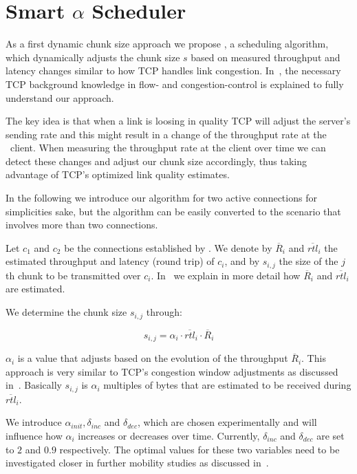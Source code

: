 \section{Smart $\alpha$ Scheduler}
\label{sec:alpha-approach}

As a first dynamic chunk size approach we propose \algalpha, \ie a scheduling algorithm, which dynamically adjusts the chunk size $s$ based on measured throughput and latency changes similar to how TCP handles link congestion. 
In~, the necessary TCP background knowledge in flow- and congestion-control is explained to fully understand our approach. 

The key idea is that when a link is loosing in quality TCP will adjust the server's sending rate and this might result in a change of the throughput rate at the \mhttp~client. 
When measuring the throughput rate at the client over time we can detect these changes and adjust our chunk size accordingly, thus taking advantage of TCP's optimized link quality estimates. 

In the following we introduce our algorithm for two active connections for simplicities sake, but the algorithm can be easily converted to the scenario that involves more than two connections.

Let $c_1$ and $c_2$ be the connections established by \mhttp. 
We denote by $\overline{R}_i$ and $\overline{rtl}_i$ the estimated throughput and latency (round trip) of $c_i$, and by $s_{i,j}$ the size of the $j$th chunk to be transmitted over $c_i$. 
In~ we explain in more detail how $\overline{R}_i$ and $\overline{rtl}_i$ are estimated. 

We determine the chunk size $s_{i,j}$ through:

$$s_{i,j}=\alpha_i \cdot \overline{rtl}_i \cdot \overline{R}_i$$

$\alpha_i$ is a value that adjusts based on the evolution of the throughput $\overline{R}_i$. 
This approach is very similar to TCP's congestion window adjustments as discussed in~. 
Basically $s_{i,j}$ is $\alpha_i$ multiples of bytes that are estimated to be received during $\overline{rtl}_i$. 

We introduce $\alpha_{init}, \delta_{inc}$ and $\delta_{dec}$, which are chosen experimentally and will influence how $\alpha_i$ increases or decreases over time. 
Currently, $\delta_{inc}$ and $\delta_{dec}$ are set to $2$ and $0.9$ respectively. 
The optimal values for these two variables need to be investigated closer in further mobility studies as discussed in~.


